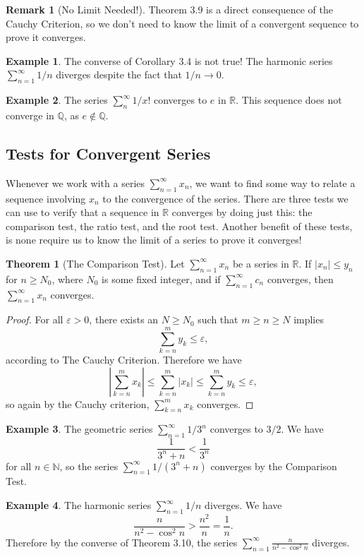 \documentclass{article}
\newcommand{\N}{\mathbb{N}}
\newcommand{\R}{\mathbb{R}}
\newcommand{\Q}{\mathbb{Q}}
\theoremstyle{definition}
\newtheorem{theorem}{Theorem}[section]
\newtheorem{example}{Example}[section]
\newtheorem{remark}{Remark}[section]
\begin{document}
\begin{remark}[No Limit Needed!]
Theorem 3.9 is a direct consequence of the Cauchy Criterion, so we don't need to know the limit of a convergent sequence to prove it converges. 
\end{remark}
\begin{example}
	The converse of Corollary 3.4 is not true! The harmonic series $ \sum_{n=1}^{\infty} 1/n$ diverges despite the fact that $ 1/n\to 0 $. 
\end{example}


\begin{example}
	The series $ \sum_{n}^{\infty}1/x! $ converges to $ e $ in $ \R $. This sequence does not converge in $ \Q $, as $ e\notin \Q $. 
\end{example}
\subsection{Tests for Convergent Series}
Whenever we work with a series $ \sum_{n=1}^{\infty}x_n $, we want to find some way to relate a sequence involving $ x_n $ to the convergence of the series. There are three tests we can use to verify that a sequence in $ \R $ converges by doing just this: the comparison test, the ratio test, and the root test. Another benefit of these tests, is none require us to know the limit of a series to prove it converges! 
\begin{theorem}[The Comparison Test]
	Let $ \sum_{n=1}^{\infty}x_n  $ be a series in $ \R $. If $ |x_n|\le y_n $ for $ n\ge N_0 $, where $ N_0 $ is some fixed integer, and if $ \sum_{n=1}^{\infty}c_n $ converges, then $ \sum_{n=1}^\infty x_n $ converges.
\end{theorem}
\begin{proof}
	For all $ \varepsilon>0 $, there exists an $ N\ge N_0 $ such that $ m\ge n\ge N $ implies $$ \sum_{k=n}^{m}y_k\le \varepsilon  ,$$ according to The Cauchy Criterion. Therefore we have $$ \left\lvert\sum_{k=n}^{m}x_k \right\rvert\le\sum_{k=n}^{m}|x_k|\le\sum_{k=n}^{m}y_k\le \varepsilon,  $$ so again by the Cauchy criterion, $\sum_{k=n}^{m}x_k  $ converges. 
\end{proof}
\begin{example}
	The geometric series $ \sum_{n=1}^{\infty}1/3^n $ converges to $ 3/2 $. We have $$\frac{1}{3^n+n}<\frac{1}{3^n} $$ for all $ n\in\N $, so the series $ \sum_{n=1}^{\infty}1/(3^n+n) $ converges by the Comparison Test.
\end{example}
\begin{example}
	The harmonic series $ \sum_{n=1}^{\infty}1/n  $ diverges. We have $$\frac{n}{n^2-\cos^2 n}>\frac{n^2}{n}=\frac{1}{n}.$$	Therefore by the converse of Theorem 3.10, the series $ \sum_{n=1}^{\infty}\frac{n}{n^2-\cos^2 n} $ diverges.
\end{example}
\end{document}
